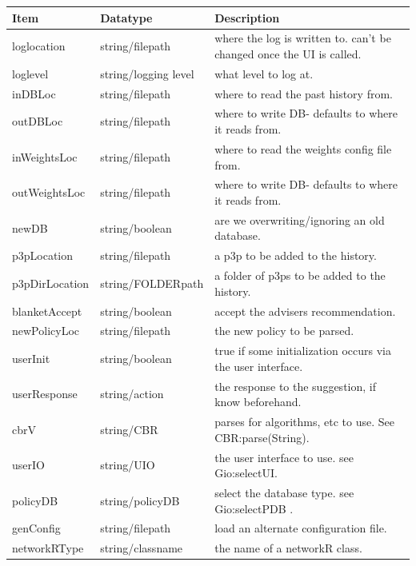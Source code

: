 \begin{center}
  \begin{table}[h!]
    \label{configTable}
    \begin{tabular} { | l | l | p{7cm} | }
      \hline
      \textbf{Item} & \textbf{Datatype} & \textbf{Description} \\ \hline
      loglocation & string/filepath  & where the log is written to. can't be changed once the UI is  called. \\ \hline
      loglevel & string/logging level	& what level to log at. \\ \hline
      inDBLoc & string/filepath	& where to read the past history from. \\ \hline
      outDBLoc & string/filepath & where to write DB- defaults to where it reads from. \\ \hline
      inWeightsLoc& string/filepath & where to read the weights config file from. \\ \hline
      outWeightsLoc	& string/filepath & where to write DB- defaults to where it reads from. \\ \hline
      newDB & string/boolean & are we overwriting/ignoring an old database. \\ \hline
      p3pLocation & string/filepath & a p3p to be added to the history. \\ \hline
      p3pDirLocation	& string/FOLDERpath& a folder of p3ps to be added to the history. \\ \hline
      blanketAccept & string/boolean & accept the advisers recommendation. \\ \hline
      newPolicyLoc & string/filepath	& the new policy to be parsed. \\ \hline
      userInit & string/boolean	& true if some initialization occurs via the user interface. \\ \hline
      userResponse & string/action	& the response to the suggestion, if know beforehand. \\ \hline
      cbrV & string/CBR & parses for algorithms, etc to use. See CBR:parse(String). \\ \hline
      userIO & string/UIO	& the user interface to use. see Gio:selectUI. \\ \hline
      policyDB & string/policyDB & select the database type. see Gio:selectPDB . \\ \hline
      genConfig	& string/filepath & load an alternate configuration file. \\ \hline
      networkRType & string/classname & the name of a networkR class. \\ \hline

\end{tabular}
\end{table}
\end{center}
